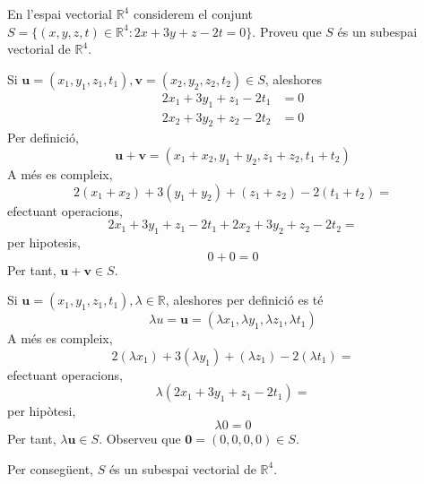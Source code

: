 \bigskip

\begin{exercici}
En l’espai vectorial $\mathbb{R}^{4}$ considerem el conjunt $%
S=\{(x,y,z,t)\in \mathbb{R}^{4}:2x+3y+z-2t=0\}$. Proveu que $S$ és un
subespai vectorial de $\mathbb{R}^{4}$.

\end{exercici}
\begin{solucio}
Si $\mathbf{u}=(x_{1},y_{1},z_{1},t_{1}),\mathbf{v}%
=(x_{2},y_{2},z_{2},t_{2})\in S$, aleshores%
\begin{align*}
2x_{1}+3y_{1}+z_{1}-2t_{1} &=0 \\
2x_{2}+3y_{2}+z_{2}-2t_{2} &=0
\end{align*}%
Per definició,%
\begin{equation*}
\mathbf{u}+\mathbf{v}=(x_{1}+x_{2},y_{1}+y_{2},z_{1}+z_{2},t_{1}+t_{2})
\end{equation*}%
A més es compleix,%
\begin{equation*}
2(x_{1}+x_{2})+3(y_{1}+y_{2})+(z_{1}+z_{2})-2(t_{1}+t_{2})=
\end{equation*}%
efectuant operacions,%
\begin{equation*}
2x_{1}+3y_{1}+z_{1}-2t_{1}+2x_{2}+3y_{2}+z_{2}-2t_{2}=
\end{equation*}%
per hipotesis,%
\begin{equation*}
0+0=0
\end{equation*}%
Per tant, $\mathbf{u}+\mathbf{v}\in S$.

Si $\mathbf{u}=(x_{1},y_{1},z_{1},t_{1}),\lambda \in \mathbb{R}$, aleshores
per definició es té%
\begin{equation*}
\lambda u=\mathbf{u}=(\lambda x_{1},\lambda y_{1},\lambda z_{1},\lambda
t_{1})
\end{equation*}%
A més es compleix,%
\begin{equation*}
2(\lambda x_{1})+3(\lambda y_{1})+(\lambda z_{1})-2(\lambda t_{1})=
\end{equation*}%
efectuant operacions,%
\begin{equation*}
\lambda (2x_{1}+3y_{1}+z_{1}-2t_{1})=
\end{equation*}%
per hipòtesi,%
\begin{equation*}
\lambda 0=0
\end{equation*}%
Per tant, $\lambda \mathbf{u}\in S$. Observeu que $\mathbf{0}%
=(0,0,0,0)\in S$.

Per consegüent, $S$ és un subespai vectorial de $\mathbb{R}^{4}$.
\end{solucio}

